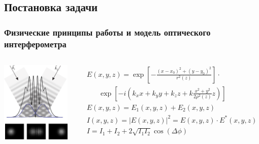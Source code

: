 \subsection{Постановка задачи}

\begin{frame}
\frametitle{Физические принципы работы и модель оптического интерферометра}
\begin{columns}
  \centering
  \includegraphics[width=0.9\linewidth]{images/interf_expl.png}


\begin{align*}
& E(x,y,z)=\exp \left[-\frac{\left(x-x_{0}\right)^{2}+\left(y-y_{0}\right)^{2}}{r^{2}(z)}\right] \cdot \\
& \hspace{20pt} \exp \left[-i\left(k_{x} x+k_{y} y+k_{z} z + k\frac{x^2+y^2}{2\rho^2(z)} z\right)\right] \\
& E(x, y, z) = E_1(x, y, z) + E_2(x, y, z) \\
& I(x, y, z) = |E(x, y, z)|^2 = E(x,y,z) \cdot E^*(x,y,z) \\
& I= I_1 + I_2 + 2 \sqrt{I_1I_2}\cos(\Delta \phi)
\end{align*}

\end{columns} 
\end{frame}

